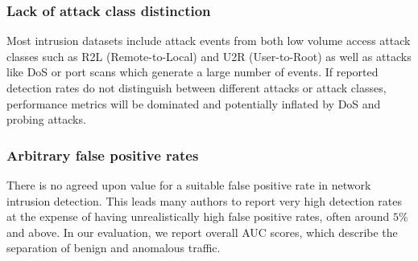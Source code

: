 \subsubsection{Lack of attack class distinction}

Most intrusion datasets include attack events from both low volume access attack classes such as R2L (Remote-to-Local) and U2R (User-to-Root) as well as attacks like DoS or port scans which generate a large number of events. %
If reported detection rates do not distinguish between different attacks or attack classes, performance metrics will be dominated and potentially inflated by DoS and probing attacks. %



\subsubsection{Arbitrary false positive rates}\label{Sec:ArbFP}
There is no agreed upon value for a suitable false positive rate in network intrusion detection. This leads many authors to report very high detection rates at the expense of having unrealistically high false positive rates, often around $5\%$ and above. %
In our evaluation, %
we report overall AUC scores, which describe the separation of benign and anomalous traffic.

